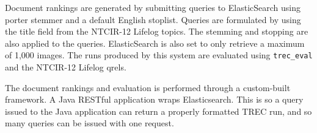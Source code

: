 Document rankings are generated by submitting queries to ElasticSearch using porter stemmer and a default English stoplist. Queries are formulated by using the title field from the NTCIR-12 Lifelog topics. The stemming and stopping are also applied to the queries. ElasticSearch is also set to only retrieve a maximum of 1,000 images. The runs produced by this system are evaluated using \verb|trec_eval| and the NTCIR-12 Lifelog qrels.

The document rankings and evaluation is performed through a custom-built framework. A Java RESTful application wraps Elasticsearch. This is so a query issued to the Java application can return a properly formatted TREC run, and so many queries can be issued with one request. 
